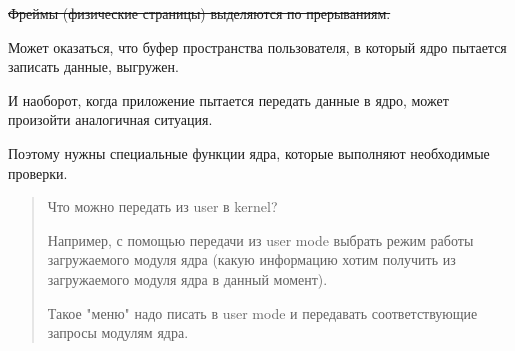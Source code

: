 \sout{Фреймы (физические страницы) выделяются по прерываниям.}

Может оказаться, что буфер пространства пользователя, в который ядро пытается записать данные, выгружен.

И наоборот, когда приложение пытается передать данные в ядро, может произойти аналогичная ситуация.

Поэтому нужны специальные функции ядра, которые выполняют необходимые проверки.

\begin{quote}
Что можно передать из user в kernel?

Например, с помощью передачи из user mode выбрать режим работы загружаемого модуля ядра (какую информацию хотим получить из загружаемого модуля ядра в данный момент).

Такое "меню" надо писать в user mode и передавать соответствующие запросы модулям ядра.
\end{quote}








